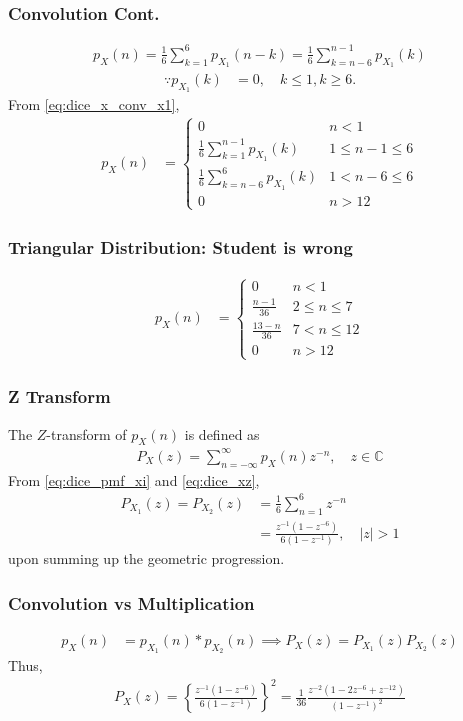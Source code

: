 \documentclass{beamer}
\providecommand{\brak}[1]{\ensuremath{\left(#1\right)}}
\providecommand{\cbrak}[1]{\ensuremath{\left\{#1\right\}}}
\theoremstyle{remark}
\providecommand{\abs}[1]{\left\vert#1\right\vert}
\numberwithin{equation}{section}
\begin{document}
\begin{frame}
\frametitle{Convolution Cont.}
\begin{align}
p_X(n) = \frac{1}{6}\sum_{k=1}^{6}p_{X_1}(n-k)= \frac{1}{6}\sum_{k=n-6}^{n-1}p_{X_1}(k)
\label{eq:dice_x_conv_x1}
\end{align}
\begin{align}
\because p_{X_1}(k) &= 0, \quad k \le 1, k \ge 6.
\end{align}
From \eqref{eq:dice_x_conv_x1},
%
\begin{align}
p_X(n) &= 
\begin{cases}
0 & n < 1
\\
\frac{1}{6}\sum_{k=1}^{n-1}p_{X_1}(k) &  1 \le n-1 \le  6
\\
\frac{1}{6}\sum_{k=n-6}^{6}p_{X_1}(k) & 1 < n-6 \le 6
\\
0 & n > 12
\end{cases}
\label{eq:dice_x_conv_cond}
\end{align}
\end{frame}
\begin{frame}
\frametitle{Triangular Distribution: Student is wrong}
\begin{align}
p_X(n) &= 
\begin{cases}
0 & n < 1
\\
\frac{n-1}{36} &  2 \le n \le  7
\\
\frac{13-n}{36} & 7 < n \le 12
\\
0 & n > 12
\end{cases}
\label{eq:dice_x_conv_final}
\end{align}
\end{frame}
\begin{frame}
\frametitle{Z Transform}
The $Z$-transform of $p_X(n)$ is defined as 
\begin{align}
P_X(z) = \sum_{n = -\infty}^{\infty}p_X(n)z^{-n}, \quad z \in \mathbb{C}
\label{eq:dice_xz}
\end{align}
%
From \eqref{eq:dice_pmf_xi} and \eqref{eq:dice_xz}, 
\begin{align}
P_{X_1}(z) =P_{X_2}(z) &= \frac{1}{6}\sum_{n = 1}^{6}z^{-n}
\\
&=\frac{z^{-1}\brak{1-z^{-6}}}{6\brak{1-z^{-1}}}, \quad \abs{z} > 1
\label{eq:dice_xiz}
\end{align}
upon summing up the geometric progression.  
\end{frame}
\begin{frame}
\frametitle{Convolution vs Multiplication}
\begin{align}
p_X(n) &= p_{X_1}(n)*p_{X_2}(n)
\implies
P_X(z) = P_{X_1}(z)P_{X_2}(z)
\label{eq:dice_xzprod_def}
\end{align}
Thus,
\begin{align}
P_X(z) = \cbrak{\frac{z^{-1}\brak{1-z^{-6}}}{6\brak{1-z^{-1}}}}^2
= \frac{1}{36}\frac{z^{-2}\brak{1-2z^{-6}+z^{-12}}}{\brak{1-z^{-1}}^2}
\label{eq:dice_xzprod}
\end{align}
\end{frame}
\end{document}
